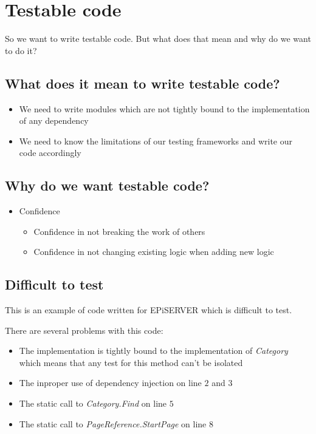 \documentclass[12pt]{article}
\begin{document}
\maketitle

\section{Testable code}
So we want to write testable code. But what does that mean and why do we want to do it?

\subsection{What does it mean to write testable code?}
\begin{itemize}
	\item We need to write modules which are not tightly bound to the implementation of any dependency
	\item We need to know the limitations of our testing frameworks and write our code accordingly
\end{itemize}

\subsection{Why do we want testable code?}
\begin{itemize}
	\item Confidence
	\begin{itemize}
		\item Confidence in not breaking the work of others
		\item Confidence in not changing existing logic when adding new logic
	\end{itemize}
\end{itemize}

\subsection{Difficult to test}
This is an example of code written for EPiSERVER which is difficult to test.


There are several problems with this code:
\begin{itemize}
	\item The implementation is tightly bound to the implementation of \emph{Category} which means that any test for this method can't be isolated 
	\item The inproper use of dependency injection on line $2$ and $3$
	\item The static call to \emph{Category.Find} on line $5$
	\item The static call to \emph{PageReference.StartPage} on line $8$
\end{itemize}
\end{document}
